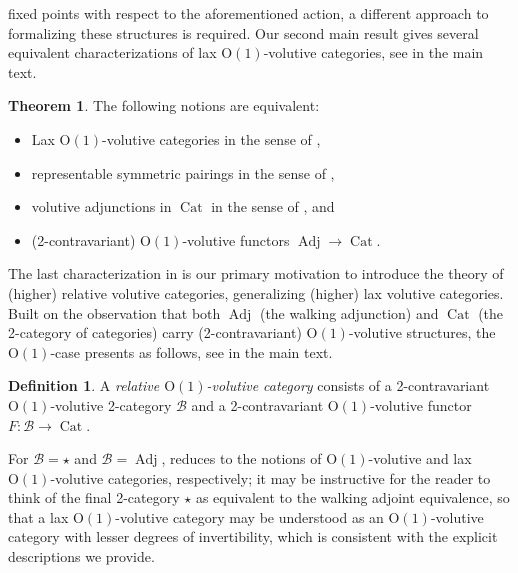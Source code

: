 \documentclass{article}
\newcommand{\Cat}{\operatorname{Cat}}%
\newcommand{\Adj}{\operatorname{Adj}}%
\newcommand{\Oone}{\operatorname{O(1)}}
\newcommand{\B}{\mathcal{B}}
\numberwithin{equation}{section}
\theoremstyle{definition}
\newtheorem{Idefinition}{Definition}
\theoremstyle{theorem}
\newtheorem{Itheorem}{Theorem}
\begin{document}
fixed points with respect to the aforementioned action, a different approach to formalizing these structures is required. Our second main result gives several 
equivalent characterizations of lax $\Oone$-volutive categories, see  in the main text.
\begin{Itheorem}\label{Theorem: equivalent formulations of lax Oone volutive categories}
    The following notions are equivalent: 
    \begin{itemize}
        \item[(i)] Lax $\Oone$-volutive categories in the sense of ,
        \item[(ii)] representable symmetric pairings in the sense of ,
        \item[(iii)] volutive adjunctions in $\Cat$ in the sense of , and
        \item[(iv)] (2-contravariant) $\Oone$-volutive functors $\Adj \to \Cat$.
    \end{itemize}
\end{Itheorem}
The last characterization in  is our primary motivation to introduce the theory of 
(higher) relative volutive categories, generalizing (higher) lax volutive categories. Built on the observation that both $\Adj$ (the walking adjunction) and 
$\Cat$ (the 2-category of categories) carry (2-contravariant) $\Oone$-volutive structures, the $\Oone$-case presents as follows, see 
 in the main text.
\begin{Idefinition}\label{Definition: relative Oone volutive categories}
    A \emph{relative $\Oone$-volutive category} consists of a 2-contravariant $\Oone$-volutive 2-category $\B$ and a 
    2-contravariant $\Oone$-volutive functor $F \colon \B \to \Cat$. 
\end{Idefinition}
For $\B = \star$ and $\B=\Adj$,  reduces to the notions of $\Oone$-volutive and lax $\Oone$-volutive categories, 
respectively; it may be instructive for the reader to think of the final 2-category $\star$ as equivalent to the walking adjoint equivalence, so that a lax $\Oone$-volutive 
category may be understood as an $\Oone$-volutive category with lesser degrees of invertibility, which is consistent with the explicit descriptions we provide. \\
\end{document}
